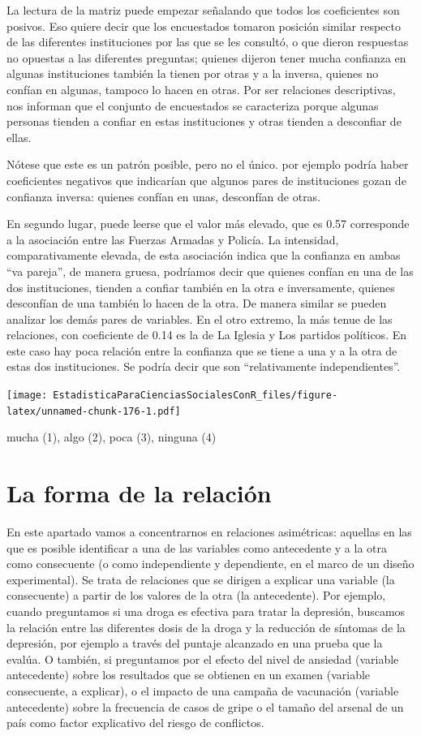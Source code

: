 \documentclass[]{book}
\begin{document}
La lectura de la matriz puede empezar señalando que todos los coeficientes son posivos. Eso quiere decir que los encuestados tomaron posición similar respecto de las diferentes instituciones por las que se les consultó, o que dieron respuestas no opuestas a las diferentes preguntas; quienes dijeron tener mucha confianza en algunas instituciones también la tienen por otras y a la inversa, quienes no confían en algunas, tampoco lo hacen en otras. Por ser relaciones descriptivas, nos informan que el conjunto de encuestados se caracteriza porque algunas personas tienden a confiar en estas instituciones y otras tienden a desconfiar de ellas.

Nótese que este es un patrón posible, pero no el único. por ejemplo podría haber coeficientes negativos que indicarían que algunos pares de instituciones gozan de confianza inversa: quienes confían en unas, desconfían de otras.

En segundo lugar, puede leerse que el valor más elevado, que es 0.57 corresponde a la asociación entre las Fuerzas Armadas y Policía. La intensidad, comparativamente elevada, de esta asociación indica que la confianza en ambas ``va pareja'', de manera gruesa, podríamos decir que quienes confían en una de las dos instituciones, tienden a confiar también en la otra e inversamente, quienes desconfían de una también lo hacen de la otra. De manera similar se pueden analizar los demás pares de variables.
En el otro extremo, la más tenue de las relaciones, con coeficiente de 0.14 es la de La Iglesia y Los partidos políticos. En este caso hay poca relación entre la confianza que se tiene a una y a la otra de estas dos instituciones. Se podría decir que son ``relativamente independientes''.

\texttt{[image: EstadisticaParaCienciasSocialesConR\_files/figure-latex/unnamed-chunk-176-1.pdf]}

mucha (1), algo (2), poca (3), ninguna (4)

\hypertarget{la-forma-de-la-relaciuxf3n}{%
\section{La forma de la relación}\label{la-forma-de-la-relaciuxf3n}}

En este apartado vamos a concentrarnos en relaciones asimétricas: aquellas en las que es posible identificar a una de las variables como antecedente y a la otra como consecuente (o como independiente y
dependiente, en el marco de un diseño experimental). Se trata de
relaciones que se dirigen a explicar una variable (la consecuente) a
partir de los valores de la otra (la antecedente). Por ejemplo, cuando preguntamos si una droga es efectiva para tratar la depresión, buscamos la relación entre las diferentes dosis de la droga y la reducción de síntomas de la depresión, por ejemplo a través del puntaje alcanzado en una prueba que la evalúa. O también, si preguntamos por el efecto del nivel de ansiedad (variable antecedente) sobre los resultados que se obtienen en un examen (variable consecuente, a explicar), o el impacto de una campaña de vacunación (variable antecedente) sobre la frecuencia de casos de gripe o el tamaño del arsenal de un país como factor explicativo del riesgo de conflictos.
\end{document}
